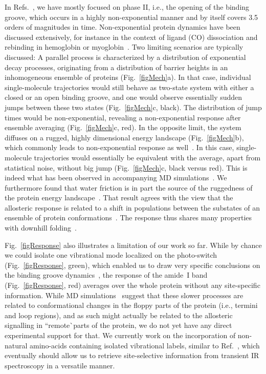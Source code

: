 \documentclass[journal=jacsat,manuscript=article]{achemso}
\begin{document}
In Refs.~\cite{buchli13,waldauer14}, we have mostly focused on phase
II, i.e., the opening of the binding groove, which occurs in a highly
non-exponential manner and by itself covers 3.5 orders of magnitudes
in time. Non-exponential protein dynamics have been discussed
extensively, for instance in the context of ligand (CO) dissociation
and rebinding in hemoglobin or myoglobin~\cite{Frauenfelder91,
  frauenfelder09}. Two limiting scenarios are typically discussed: A
parallel process is characterized by a distribution of exponential
decay processes, originating from a distribution of barrier heights in
an inhomogeneous ensemble of proteins (Fig.~\ref{figMech}a). In that
case, individual single-molecule trajectories would still behave as
two-state system with either a closed or an open binding groove, and
one would observe essentially sudden jumps between these two states
(Fig.~\ref{figMech}c, black). The distribution of jump times would be
non-exponential, revealing a non-exponential response after ensemble
averaging (Fig.~\ref{figMech}c, red). In the opposite limit, the
system diffuses on a rugged, highly dimensional energy landscape
(Fig.~\ref{figMech}b), which commonly leads to non-exponential
response as well~\cite{jaeckle86}. In this case, single-molecule
trajectories would essentially be equivalent with the average, apart
from statistical noise, without big jump (Fig.~\ref{figMech}c, black
versus red). This is indeed what has been observed in accompanying MD
simulations~\cite{buchli13}. We furthermore found that water friction
is in part the source of the ruggedness of the protein energy
landscape~\cite{buchli13,waldauer14}. That result agrees with the view
that the allosteric response is related to a shift in populations
between the substates of an ensemble of protein
conformations~\cite{gunasekaran04, tsai14}. The response thus shares
many properties with downhill folding~\cite{kubelka04,yang03,sadqi06}.

Fig.~\ref{figResponse} also illustrates a limitation of our work so
far. While by chance we could isolate one vibrational mode localized
on the photo-switch (Fig.~\ref{figResponse}, green), which enabled us
to draw very specific conclusions on the binding groove
dynamics~\cite{buchli13,waldauer14}, the response of the amide~I band
(Fig.~\ref{figResponse}, red) averages over the whole protein without
any site-specific information. While MD
simulations~\cite{buchenberg14} suggest that these slower processes
are related to conformational changes in the floppy parts of the
protein (i.e., termini and loop regions), and as such might actually
be related to the allosteric signalling in ``remote^^ parts of the
protein, we do not yet have any direct experimental support for
that. We currently work on the incorporation of non-natural
amino-acids containing isolated vibrational labels, similar to
Ref.~\cite{bloem12}, which eventually should allow us to retrieve
site-selective information from transient IR spectroscopy in a
versatile manner.
\end{document}
